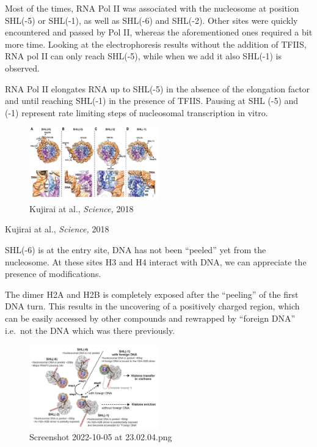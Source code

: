 Most of the times, RNA Pol II was associated with the nucleosome at position SHL(-5) or SHL(-1), as well as SHL(-6) and SHL(-2). Other sites were quickly encountered and passed by Pol II, whereas the aforementioned ones required a bit more time. Looking at the electrophoresis results without the addition of TFIIS, RNA pol II can only reach SHL(-5), while when we add it also SHL(-1) is observed.

RNA Pol II elongates RNA up to SHL(-5) in the absence of the elongation factor and until reaching SHL(-1) in the presence of TFIIS. Pausing at SHL (-5) and (-1) represent rate limiting steps of nucleosomal transcription in vitro.

\begin{figure}
\centering
\includegraphics[width=0.5\textwidth]{../_resources/Screenshot_2022-10-05_at_22-54-39.png}
\caption{Kujirai at al., \emph{Science,} 2018}
\end{figure}

Kujirai at al., \emph{Science,} 2018

SHL(-6) is at the entry site, DNA has not been ``peeled'' yet from the nucleosome. At these sites H3 and H4 interact with DNA, we can appreciate the presence of modifications.

The dimer H2A and H2B is completely exposed after the ``peeling'' of the first DNA turn. This results in the uncovering of a positively charged region, which can be easily accessed by other compounds and rewrapped by ``foreign DNA'' i.e.~not the DNA which was there previously.

\begin{figure}
\centering
\includegraphics[width=0.5\textwidth]{../_resources/Screenshot_2022-10-05_at_23-02-04.png}
\caption{Screenshot 2022-10-05 at 23.02.04.png}
\end{figure}

